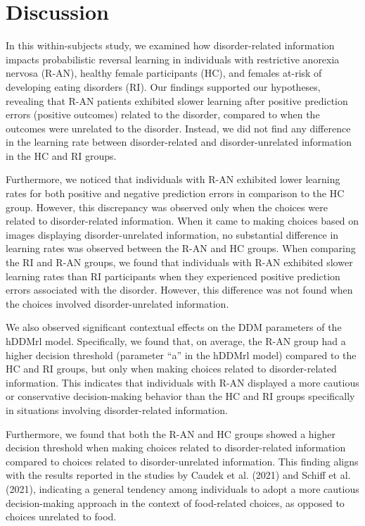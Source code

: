 \documentclass[
  man,floatsintext]{apa6}
\begin{document}
\hypertarget{discussion}{%
\section{Discussion}\label{discussion}}

In this within-subjects study, we examined how disorder-related information impacts probabilistic reversal learning in individuals with restrictive anorexia nervosa (R-AN), healthy female participants (HC), and females at-risk of developing eating disorders (RI). Our findings supported our hypotheses, revealing that R-AN patients exhibited slower learning after positive prediction errors (positive outcomes) related to the disorder, compared to when the outcomes were unrelated to the disorder. Instead, we did not find any difference in the learning rate between disorder-related and disorder-unrelated information in the HC and RI groups.

Furthermore, we noticed that individuals with R-AN exhibited lower learning rates for both positive and negative prediction errors in comparison to the HC group. However, this discrepancy was observed only when the choices were related to disorder-related information. When it came to making choices based on images displaying disorder-unrelated information, no substantial difference in learning rates was observed between the R-AN and HC groups. When comparing the RI and R-AN groups, we found that individuals with R-AN exhibited slower learning rates than RI participants when they experienced positive prediction errors associated with the disorder. However, this difference was not found when the choices involved disorder-unrelated information.

We also observed significant contextual effects on the DDM parameters of the hDDMrl model. Specifically, we found that, on average, the R-AN group had a higher decision threshold (parameter ``a'' in the hDDMrl model) compared to the HC and RI groups, but only when making choices related to disorder-related information. This indicates that individuals with R-AN displayed a more cautious or conservative decision-making behavior than the HC and RI groups specifically in situations involving disorder-related information.

Furthermore, we found that both the R-AN and HC groups showed a higher decision threshold when making choices related to disorder-related information compared to choices related to disorder-unrelated information. This finding aligns with the results reported in the studies by Caudek et al. (2021) and Schiff et al. (2021), indicating a general tendency among individuals to adopt a more cautious decision-making approach in the context of food-related choices, as opposed to choices unrelated to food.
\end{document}
